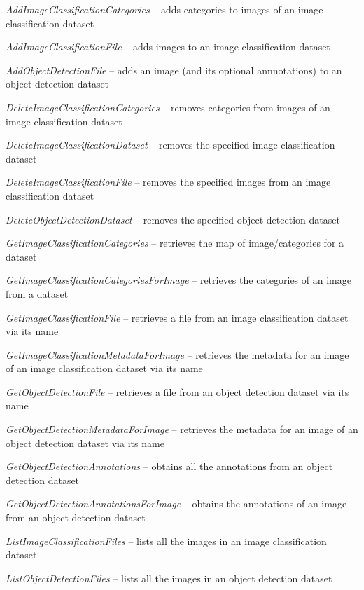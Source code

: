 \documentclass[a4paper]{book}
\begin{document}
\begin{tight_itemize}
  \item \textit{AddImageClassificationCategories} -- adds categories to images of an image classification dataset
  \item \textit{AddImageClassificationFile} -- adds images to an image classification dataset
  \item \textit{AddObjectDetectionFile} -- adds an image (and its optional annnotations) to an object detection dataset
  \item \textit{DeleteImageClassificationCategories} -- removes categories from images of an image classification dataset
  \item \textit{DeleteImageClassificationDataset} -- removes the specified image classification dataset
  \item \textit{DeleteImageClassificationFile} -- removes the specified images from an image classification dataset
  \item \textit{DeleteObjectDetectionDataset} -- removes the specified object detection dataset
  \item \textit{GetImageClassificationCategories} -- retrieves the map of image/categories for a dataset
  \item \textit{GetImageClassificationCategoriesForImage} -- retrieves the categories of an image from a dataset
  \item \textit{GetImageClassificationFile} -- retrieves a file from an image classification dataset via its name
  \item \textit{GetImageClassificationMetadataForImage} -- retrieves the metadata for an image of an image classification dataset via its name
  \item \textit{GetObjectDetectionFile} -- retrieves a file from an object detection dataset via its name
  \item \textit{GetObjectDetectionMetadataForImage} -- retrieves the metadata for an image of an object detection dataset via its name
  \item \textit{GetObjectDetectionAnnotations} -- obtains all the annotations from an object detection dataset
  \item \textit{GetObjectDetectionAnnotationsForImage} -- obtains the annotations of an image from an object detection dataset
  \item \textit{ListImageClassificationFiles} -- lists all the images in an image classification dataset
  \item \textit{ListObjectDetectionFiles} -- lists all the images in an object detection dataset

\end{tight_itemize}
\end{document}
